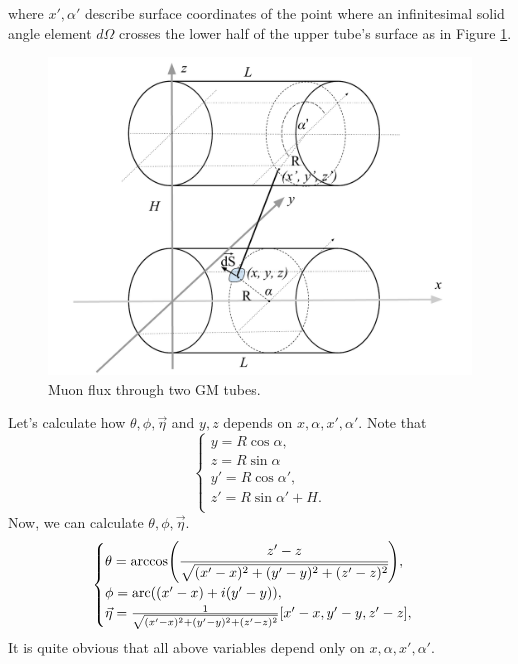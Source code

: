 \documentclass[main.tex]{subfiles}
\begin{document}
where $x', \alpha'$ describe surface coordinates of the point where an infinitesimal solid angle element $d\Omega$ crosses the lower half of the upper tube's surface as in Figure \ref{fig:tubes}.

\begin{figure}[H]
\centering
\includegraphics[scale=0.5]{figs/Tubes}
\caption{Muon flux through two GM tubes.}
\label{fig:tubes}
\end{figure}

Let's calculate how $\theta, \phi, \vec{\eta}$ and $y,z$ depends on $x, \alpha, x', \alpha'$. Note that
\begin{equation}
\begin{cases}
y = R \cos\alpha,\\
z = R \sin\alpha\\
y'= R \cos\alpha',\\
z'= R \sin\alpha' + H.\\
\end{cases}
\end{equation}
Now, we can calculate $\theta, \phi, \vec{\eta}$.
\begin{equation}
\begin{cases}
\theta = \arccos(\cfrac{z'-z}{\sqrt{(x'-x)^2 + (y'-y)^2 + (z' - z)^2}}),\\
\phi = \text{arc}((x'- x) +  i(y' - y)),\\
\vec{\eta} = \frac{1}{\sqrt{(x'-x)^2 + (y'-y)^2 + (z' - z)^2}}[x' - x, y' - y, z' - z],\\
\end{cases}
\end{equation}
It is quite obvious that all above variables depend only on $x, \alpha, x', \alpha'$.
\end{document}
